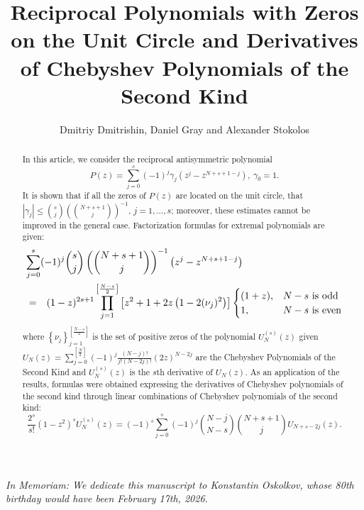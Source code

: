 \documentclass[12pt]{article}
\title{Reciprocal Polynomials with Zeros on the Unit Circle and Derivatives of Chebyshev Polynomials of the Second Kind}
\author{Dmitriy Dmitrishin, Daniel Gray and Alexander Stokolos}
\newcommand{\abs}[1]{\left|#1\right|}
\newcommand{\pa}[1]{\left(#1\right)}
\newcommand{\br}[1]{\left[#1\right]}
\newcommand{\cb}[1]{\left\{#1\right\}}
\begin{document}
\date{}
\maketitle

\begin{center}
\textit{In Memoriam: We dedicate this manuscript to Konstantin Oskolkov, whose 80th birthday would have been  
February 17th, 2026.}
\end{center}

\begin{abstract}
In this article, we consider the reciprocal antisymmetric polynomial
\begin{displaymath}
P(z) = \sum_{j = 0}^{s}(-1)^j\gamma_j\pa{z^j - z^{N + s + 1 - j}}, \ \gamma_0 = 1.
\end{displaymath}
It is shown that if all the zeros of $P(z)$ are located on the unit circle, that
$\displaystyle\abs{\gamma_j} \leq {s \choose j}\pa{{N + s + 1 \choose j}}^{-1}$, $j = 1,\ldots,s$; moreover, these estimates cannot be improved in the general case. Factorization formulas for extremal polynomials are given:
\begin{eqnarray*}
\lefteqn{\sum_{j = 0}^{s}(-1)^j{s \choose j}\pa{{N + s + 1 \choose j}}^{-1}\pa{z^j - z^{N + s + 1 - j}}} \\
&=& (1 - z)^{2s + 1} \prod_{j = 1}^{\br{\frac{N - s}{2}}} \br{z^2 + 1 + 2z\pa{1 - 2(\nu_j)^2}}
\begin{cases}
(1 + z), & N - s \mbox{ is odd} \\
1, & N - s \mbox{ is even}
\end{cases}
\end{eqnarray*}
where
$\cb{\nu_j}_{j = 1}^{\br{\frac{N - s}{2}}}$
is the set of positive zeros of the polynomial
$U_N^{(s)}(z)$ given\\
$\displaystyle U_N(z) = \sum_{j = 0}^{\br{\frac{N}{2}}} (-1)^j \frac{(N - j)!}{j!(N - 2j)!}(2z)^{N - 2j}$ are the Chebyshev Polynomials of the Second Kind and $U_N^{(s)}(z)$ is the $s$th derivative of $U_N(z)$. As an application of the results, formulas were obtained expressing the derivatives of Chebyshev polynomials of the second kind through linear combinations of Chebyshev polynomials of the second kind:
\begin{displaymath}
\frac{2^s}{s!}(1 - z^2)^sU_N^{(s)}(z) = (-1)^s \sum_{j = 0}^{s}(-1)^j{N-j \choose N-s} {N+s+1 \choose j} U_{N + s - 2j}(z).
\end{displaymath}
\end{abstract}
\end{document}
